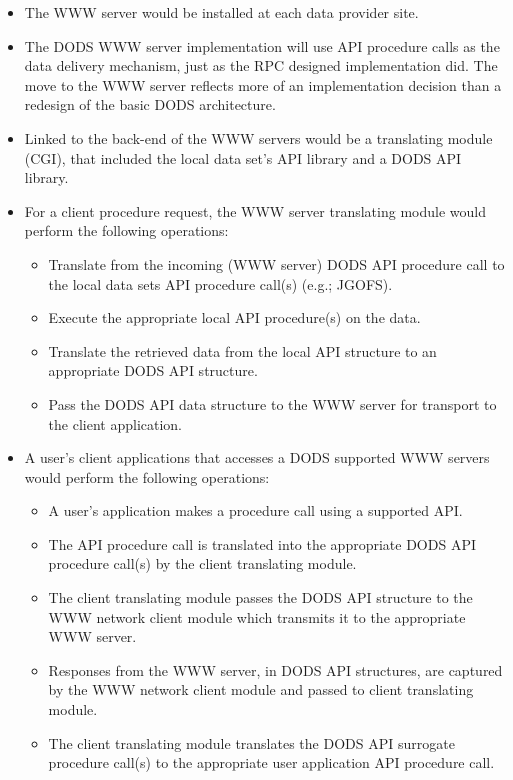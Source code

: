 \begin{itemize}

  \item The WWW server would be installed at each data provider site.
  \item The DODS WWW server implementation will use API procedure calls as
        the data delivery mechanism, just as the RPC designed implementation
        did.  The move to the WWW server reflects more of an implementation
        decision than a redesign of the basic DODS architecture.  
  \item Linked to the back-end of the WWW servers would be a translating
        module (CGI), that included the local data set's API library and a DODS
        API library. 
  \item For a client procedure request, the WWW server translating module
        would perform the following operations: 
  \begin{itemize}
	\item Translate from the incoming (WWW server) DODS API procedure
              call to the local data sets API procedure call(s) (e.g.; JGOFS). 
	\item Execute the appropriate local API procedure(s) on the data.
	\item Translate the retrieved data from the local API structure to
              an appropriate DODS API structure.
	\item Pass the DODS API data structure to the WWW server for
	      transport to the client application.
  \end{itemize}
  \item A user's client applications that accesses a DODS supported WWW
	servers would perform the following operations:
  \begin{itemize}
	\item A user's application makes a procedure call using a supported
	      API. 
	\item The API procedure call is translated into the appropriate DODS
	      API procedure call(s) by the client translating module.
	\item The client translating module passes the DODS API structure to
	      the WWW network client module  which transmits it to the
	      appropriate WWW server. 
	\item Responses from the WWW server, in DODS API structures, are
	      captured by the WWW network client module and passed to client
	      translating module.
	\item The client translating module translates the DODS API surrogate
	      procedure call(s) to the appropriate user application API
	      procedure call. 
  \end{itemize}
\end{itemize}

